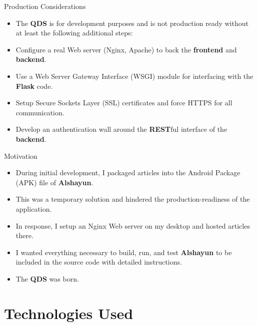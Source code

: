 \documentclass{beamer}
\begin{document}
\begin{frame}{Production Considerations}
    \begin{itemize}
        \item The \textbf{QDS} is for development purposes and is not production
            ready without at least the following additional steps:
        \item Configure a real Web server (Nginx, Apache) to back the
            \textbf{frontend} and \textbf{backend}.
        \item Use a Web Server Gateway Interface (WSGI) module for interfacing
            with the \textbf{Flask} code.
        \item Setup Secure Sockets Layer (SSL) certificates and force HTTPS for
            all communication.
        \item Develop an authentication wall around the \textbf{REST}ful
            interface of the \textbf{backend}.
    \end{itemize}
\end{frame}

\begin{frame}{Motivation}
    \begin{itemize}
        \item During initial development, I packaged articles into the Android
            Package (APK) file of \textbf{Alshayun}.
        \item This was a temporary solution and hindered the
            production-readiness of the application.
        \item In response, I setup an Nginx Web server on my desktop and hosted
            articles there.
        \item I wanted everything necessary to build, run, and test
            \textbf{Alshayun} to be included in the source code with detailed
            instructions.
        \item The \textbf{QDS} was born.
    \end{itemize}
\end{frame}

\section{Technologies Used}
\end{document}
